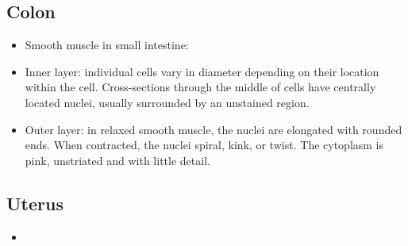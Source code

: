 \begin{itemize}
\begin{multicols}{2}
\begin{itemize}
  \end{itemize}
  \end{multicols}
  
  \subsection{Colon}

  \begin{center}
  \end{center}

  \newpage

  \begin{itemize}
    \item Smooth muscle in small intestine:
    
    \begin{center}
    \end{center}

    \item Inner layer:  individual cells vary in diameter depending on their location within the cell. Cross-sections through the middle of cells have centrally located nuclei, usually surrounded by an unstained region.
    
    \begin{center}
    \end{center}

    \item Outer layer: in relaxed smooth muscle, the nuclei are elongated with rounded ends. When contracted, the nuclei spiral, kink, or twist. The cytoplasm is pink, unstriated and with little detail.
    
    \begin{center}
    \end{center}

  \end{itemize}

  \subsection{Uterus}
  \begin{itemize}
    \item {}


\end{itemize}
\end{itemize}

